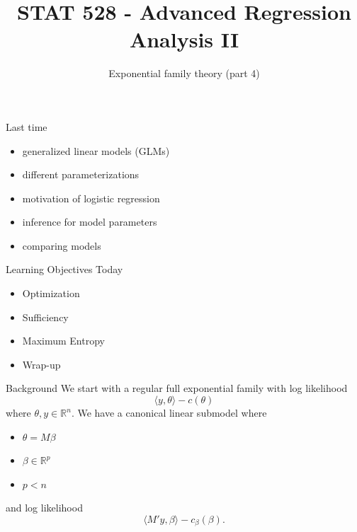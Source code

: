 \documentclass[
  ignorenonframetext,
]{beamer}
\title{STAT 528 - Advanced Regression Analysis II}
\author{Exponential family theory (part 4)}
\date{}
\institute{Daniel J. Eck\\
Department of Statistics\\
University of Illinois}
\providecommand{\tightlist}{%
  \setlength{\itemsep}{0pt}\setlength{\parskip}{0pt}}
\begin{document}
\frame{\titlepage}

\begin{frame}
\newcommand{\R}{\mathbb{R}}
\newcommand{\Prob}{\mathbb{P}}
\newcommand{\Proj}{\textbf{P}}
\newcommand{\Hcal}{\mathcal{H}}
\newcommand{\rootn}{\sqrt{n}}
\newcommand{\p}{\mathbf{p}}
\newcommand{\E}{\text{E}}
\newcommand{\Var}{\text{Var}}
\newcommand{\Cov}{\text{Cov}}

\newtheorem{cor}{Corollary}
\newtheorem{lem}{Lemma}
\newtheorem{thm}{Theorem}
\newtheorem{defn}{Definition}
\newtheorem{prop}{Proposition}
\end{frame}

\begin{frame}{Last time}
\protect\hypertarget{last-time}{}
\begin{itemize}
\tightlist
\item
  generalized linear models (GLMs)
\item
  different parameterizations
\item
  motivation of logistic regression
\item
  inference for model parameters
\item
  comparing models
\end{itemize}
\end{frame}

\begin{frame}{Learning Objectives Today}
\protect\hypertarget{learning-objectives-today}{}
\begin{itemize}
\tightlist
\item
  Optimization
\item
  Sufficiency
\item
  Maximum Entropy
\item
  Wrap-up
\end{itemize}
\end{frame}

\begin{frame}{Background}
\protect\hypertarget{background}{}
We start with a regular full exponential family with log likelihood \[
  \langle y,\theta \rangle - c(\theta)
\] where \(\theta,y \in \mathbb{R}^n\). We have a canonical linear
submodel where

\begin{itemize}
\tightlist
\item
  \(\theta = M\beta\)
\item
  \(\beta \in \mathbb{R}^p\)
\item
  \(p < n\)
\end{itemize}

and log likelihood \[
  \langle M'y, \beta \rangle - c_\beta(\beta).
\]
\end{frame}
\end{document}
